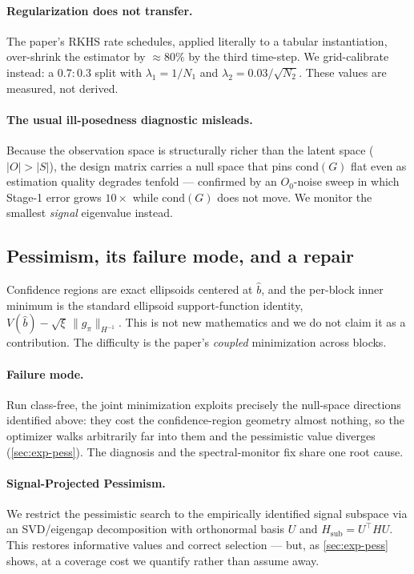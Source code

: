 \documentclass{article}
\theoremstyle{plain}
\theoremstyle{definition}
\begin{document}
\paragraph{Regularization does not transfer.} The paper's RKHS rate schedules,
applied literally to a tabular instantiation, over-shrink the estimator by
$\approx\!80\%$ by the third time-step. We grid-calibrate instead: a $0.7{:}0.3$
split with $\lambda_1 = 1/N_1$ and $\lambda_2 = 0.03/\sqrt{N_2}$. These values
are measured, not derived.

\paragraph{The usual ill-posedness diagnostic misleads.} Because the observation
space is structurally richer than the latent space ($|O| > |S|$), the design
matrix carries a null space that pins $\mathrm{cond}(G)$ flat even as estimation
quality degrades tenfold --- confirmed by an $O_0$-noise sweep in which Stage-1
error grows $10\times$ while $\mathrm{cond}(G)$ does not move. We monitor the
smallest \emph{signal} eigenvalue instead.

\subsection{Pessimism, its failure mode, and a repair}
\label{sec:method-pess}
Confidence regions are exact ellipsoids centered at $\hat b$, and the per-block
inner minimum is the standard ellipsoid support-function identity,
$V(\hat b) - \sqrt{\xi}\,\lVert g_\pi \rVert_{H^{-1}}$. This is not new
mathematics and we do not claim it as a contribution. The difficulty is the
paper's \emph{coupled} minimization across blocks.

\paragraph{Failure mode.} Run class-free, the joint minimization exploits
precisely the null-space directions identified above: they cost the
confidence-region geometry almost nothing, so the optimizer walks arbitrarily far
into them and the pessimistic value diverges (\cref{sec:exp-pess}). The
diagnosis and the spectral-monitor fix share one root cause.

\paragraph{Signal-Projected Pessimism.} We restrict the pessimistic search to the
empirically identified signal subspace via an SVD/eigengap decomposition with
orthonormal basis $U$ and $H_{\mathrm{sub}} = U^\top H U$. This restores
informative values and correct selection --- but, as \cref{sec:exp-pess} shows,
at a coverage cost we quantify rather than assume away.
\end{document}

